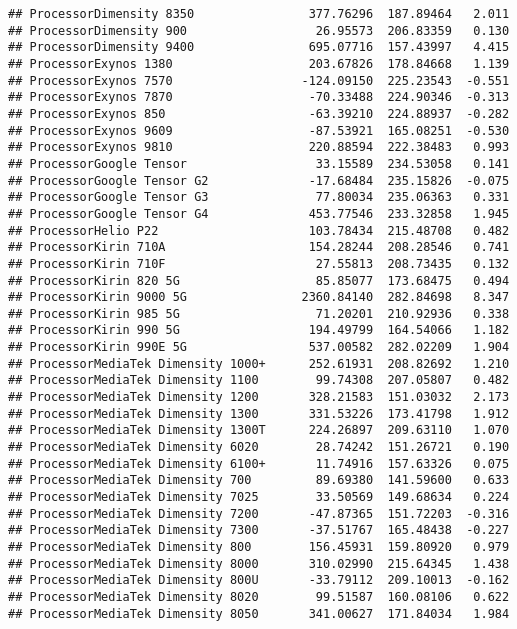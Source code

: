 \documentclass[
]{article}
\begin{document}
\begin{verbatim}
## ProcessorDimensity 8350                377.76296  187.89464   2.011
## ProcessorDimensity 900                  26.95573  206.83359   0.130
## ProcessorDimensity 9400                695.07716  157.43997   4.415
## ProcessorExynos 1380                   203.67826  178.84668   1.139
## ProcessorExynos 7570                  -124.09150  225.23543  -0.551
## ProcessorExynos 7870                   -70.33488  224.90346  -0.313
## ProcessorExynos 850                    -63.39210  224.88937  -0.282
## ProcessorExynos 9609                   -87.53921  165.08251  -0.530
## ProcessorExynos 9810                   220.88594  222.38483   0.993
## ProcessorGoogle Tensor                  33.15589  234.53058   0.141
## ProcessorGoogle Tensor G2              -17.68484  235.15826  -0.075
## ProcessorGoogle Tensor G3               77.80034  235.06363   0.331
## ProcessorGoogle Tensor G4              453.77546  233.32858   1.945
## ProcessorHelio P22                     103.78434  215.48708   0.482
## ProcessorKirin 710A                    154.28244  208.28546   0.741
## ProcessorKirin 710F                     27.55813  208.73435   0.132
## ProcessorKirin 820 5G                   85.85077  173.68475   0.494
## ProcessorKirin 9000 5G                2360.84140  282.84698   8.347
## ProcessorKirin 985 5G                   71.20201  210.92936   0.338
## ProcessorKirin 990 5G                  194.49799  164.54066   1.182
## ProcessorKirin 990E 5G                 537.00582  282.02209   1.904
## ProcessorMediaTek Dimensity 1000+      252.61931  208.82692   1.210
## ProcessorMediaTek Dimensity 1100        99.74308  207.05807   0.482
## ProcessorMediaTek Dimensity 1200       328.21583  151.03032   2.173
## ProcessorMediaTek Dimensity 1300       331.53226  173.41798   1.912
## ProcessorMediaTek Dimensity 1300T      224.26897  209.63110   1.070
## ProcessorMediaTek Dimensity 6020        28.74242  151.26721   0.190
## ProcessorMediaTek Dimensity 6100+       11.74916  157.63326   0.075
## ProcessorMediaTek Dimensity 700         89.69380  141.59600   0.633
## ProcessorMediaTek Dimensity 7025        33.50569  149.68634   0.224
## ProcessorMediaTek Dimensity 7200       -47.87365  151.72203  -0.316
## ProcessorMediaTek Dimensity 7300       -37.51767  165.48438  -0.227
## ProcessorMediaTek Dimensity 800        156.45931  159.80920   0.979
## ProcessorMediaTek Dimensity 8000       310.02990  215.64345   1.438
## ProcessorMediaTek Dimensity 800U       -33.79112  209.10013  -0.162
## ProcessorMediaTek Dimensity 8020        99.51587  160.08106   0.622
## ProcessorMediaTek Dimensity 8050       341.00627  171.84034   1.984

\end{verbatim}
\end{document}

